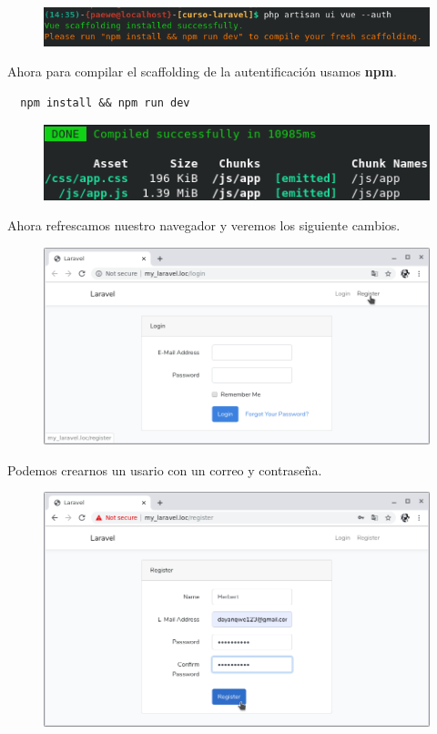 \documentclass{article}
\begin{document}
\begin{figure}[h!]
  \centering
  \includegraphics[scale=0.75]{./Pictures/126_php_artisa_auth.png}
\end{figure}

Ahora para compilar el scaffolding de la autentificación usamos \textbf{npm}.

\begin{verbatim}
  npm install && npm run dev
\end{verbatim}

\begin{figure}[h!]
  \centering
  \includegraphics[scale=0.75]{./Pictures/126_nmp_install_run_dev.png}
\end{figure}

Ahora refrescamos nuestro navegador y veremos los siguiente cambios.

\newpage

\begin{figure}[h!]
  \centering
  \includegraphics[scale=0.5]{./Pictures/127_login.png}
\end{figure}

Podemos crearnos un usario con un correo y contraseña.

\begin{figure}[h!]
  \centering
  \includegraphics[scale=0.5]{./Pictures/128_register.png}
\end{figure}
\end{document}

